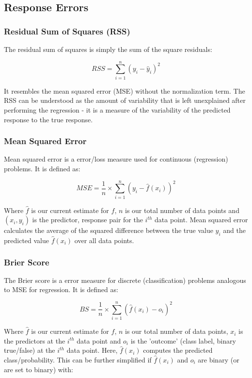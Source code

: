 \subsection{Response Errors}

\subsubsection{Residual Sum of Squares (RSS)}

The residual sum of squares is simply the sum of the square residuals:

$$ RSS = \sum^{n}_{i=1} (y_{i} - \hat{y}_{i})^{2} $$

It resembles the mean squared error (MSE) without the normalization term. The RSS can be understood as the amount of variability that is left unexplained after performing the regression - it is a measure of the variability of the predicted response to the true response.

\subsubsection{Mean Squared Error}
Mean squared error is a error/loss measure used for continuous (regression) problems. It is defined as:

$$ MSE = \frac{1}{n} \times \sum^{n}_{i=1} (y_{i}-\hat{f}(x_{i}))^{2} $$

Where $\hat{f}$ is our current estimate for $f$, $n$ is our total number of data points and $(x_{i},y_{i})$ is the predictor, response pair for the $i^{th}$ data point. Mean squared error calculates the average of the squared difference between the true value $y_{i}$ and the predicted value $\hat{f}(x_{i})$ over all data points.

\subsubsection{Brier Score}
The Brier score is a error measure for discrete (classification) problems analogous to MSE for regression. It is defined as:

$$ BS = \frac{1}{n} \times \sum^{n}_{i=1} (\hat{f}(x_{i}) - o_{i})^{2} $$

Where $\hat{f}$ is our current estimate for $f$, $n$ is our total number of data points, $x_{i}$ is the predictors at the $i^{th}$ data point and $o_{i}$ is the 'outcome' (class label, binary true/false) at the $i^{th}$ data point. Here, $\hat{f}(x_{i})$ computes the predicted class/probability. This can be further simplified if $\hat{f}(x_{i})$ and $o_{i}$ are binary (or are set to binary) with:

